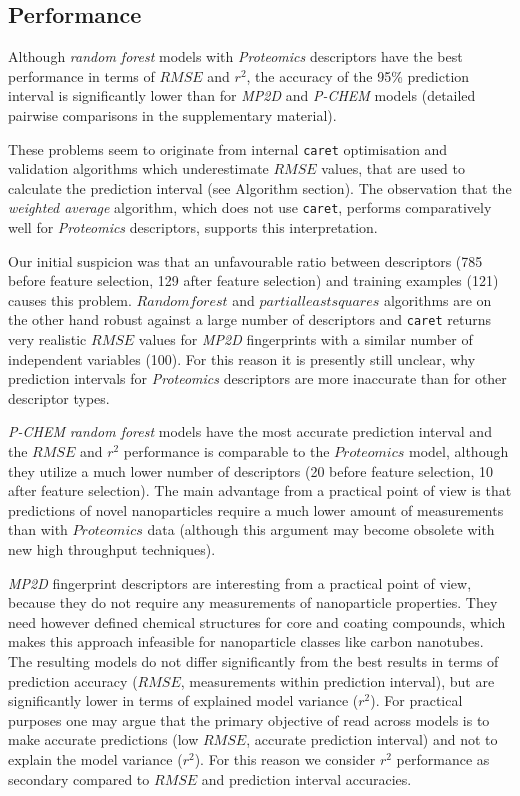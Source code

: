 \documentclass[utf8]{frontiersHLTH} %
\begin{document}
\subsection{Performance}\label{performance}

Although \emph{random forest} models with \emph{Proteomics} descriptors
have the best performance in terms of \(RMSE\) and \(r^2\), the accuracy
of the 95\% prediction interval is significantly lower than for
\emph{MP2D} and \emph{P-CHEM} models (detailed pairwise comparisons in
the supplementary material).

These problems seem to originate from internal \texttt{caret}
optimisation and validation algorithms which underestimate \(RMSE\)
values, that are used to calculate the prediction interval (see
Algorithm section). The observation that the \emph{weighted average}
algorithm, which does not use \texttt{caret}, performs comparatively
well for \emph{Proteomics} descriptors, supports this interpretation.

Our initial suspicion was that an unfavourable ratio between descriptors
(785 before feature selection, 129 after feature selection) and training
examples (121) causes this problem. \(Random forest\) and
\(partial least squares\) algorithms are on the other hand robust
against a large number of descriptors and \texttt{caret} returns very
realistic \(RMSE\) values for \emph{MP2D} fingerprints with a similar
number of independent variables (100). For this reason it is presently
still unclear, why prediction intervals for \emph{Proteomics}
descriptors are more inaccurate than for other descriptor types.

\emph{P-CHEM} \emph{random forest} models have the most accurate
prediction interval and the \(RMSE\) and \(r^2\) performance is
comparable to the \(Proteomics\) model, although they utilize a much
lower number of descriptors (20 before feature selection, 10 after
feature selection). The main advantage from a practical point of view is
that predictions of novel nanoparticles require a much lower amount of
measurements than with \(Proteomics\) data (although this argument may
become obsolete with new high throughput techniques).

\emph{MP2D} fingerprint descriptors are interesting from a practical
point of view, because they do not require any measurements of
nanoparticle properties. They need however defined chemical structures
for core and coating compounds, which makes this approach infeasible for
nanoparticle classes like carbon nanotubes. The resulting models do not
differ significantly from the best results in terms of prediction
accuracy (\(RMSE\), measurements within prediction interval), but are
significantly lower in terms of explained model variance (\(r^2\)). For
practical purposes one may argue that the primary objective of read
across models is to make accurate predictions (low \(RMSE\), accurate
prediction interval) and not to explain the model variance (\(r^2\)).
For this reason we consider \(r^2\) performance as secondary compared to
\(RMSE\) and prediction interval accuracies.
\end{document}
